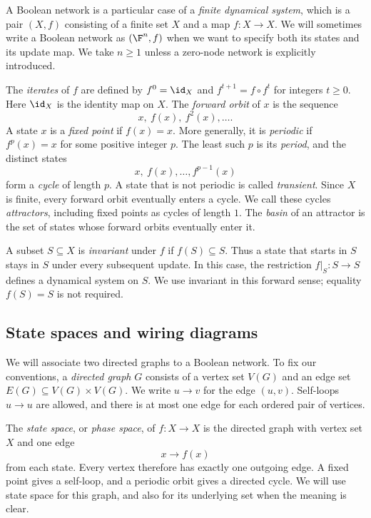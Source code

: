 A Boolean network is a particular case of a \emph{finite dynamical system}, which is a pair $(X,f)$ consisting of a finite set $X$ and a map $f\colon X\to X$. We will sometimes write a Boolean network as $(\F^n,f)$ when we want to specify both its states and its update map. We take $n\geq1$ unless a zero-node network is explicitly introduced.

The \emph{iterates} of $f$ are defined by $f^0=\id_X$ and $f^{t+1}=f\circ f^t$ for integers $t\geq0$. Here $\id_X$ is the identity map on $X$. The \emph{forward orbit} of $x$ is the sequence
\[
    x,\ f(x),\ f^2(x),\dots.
\]
A state $x$ is a \emph{fixed point} if $f(x)=x$. More generally, it is \emph{periodic} if $f^p(x)=x$ for some positive integer $p$. The least such $p$ is its \emph{period}, and the distinct states
\[
    x,\ f(x),\dots,f^{p-1}(x)
\]
form a \emph{cycle} of length $p$. A state that is not periodic is called \emph{transient}. Since $X$ is finite, every forward orbit eventually enters a cycle. We call these cycles \emph{attractors}, including fixed points as cycles of length $1$. The \emph{basin} of an attractor is the set of states whose forward orbits eventually enter it.

A subset $S\subseteq X$ is \emph{invariant} under $f$ if $f(S)\subseteq S$. Thus a state that starts in $S$ stays in $S$ under every subsequent update. In this case, the restriction $f|_S\colon S\to S$ defines a dynamical system on $S$. We use invariant in this forward sense; equality $f(S)=S$ is not required.

\subsection{State spaces and wiring diagrams}

We will associate two directed graphs to a Boolean network. To fix our conventions, a \emph{directed graph} $G$ consists of a vertex set $V(G)$ and an edge set $E(G)\subseteq V(G)\times V(G)$. We write $u\to v$ for the edge $(u,v)$. Self-loops $u\to u$ are allowed, and there is at most one edge for each ordered pair of vertices.

The \emph{state space}, or \emph{phase space}, of $f\colon X\to X$ is the directed graph with vertex set $X$ and one edge
\[
    x\longrightarrow f(x)
\]
from each state. Every vertex therefore has exactly one outgoing edge. A fixed point gives a self-loop, and a periodic orbit gives a directed cycle. We will use state space for this graph, and also for its underlying set when the meaning is clear.

